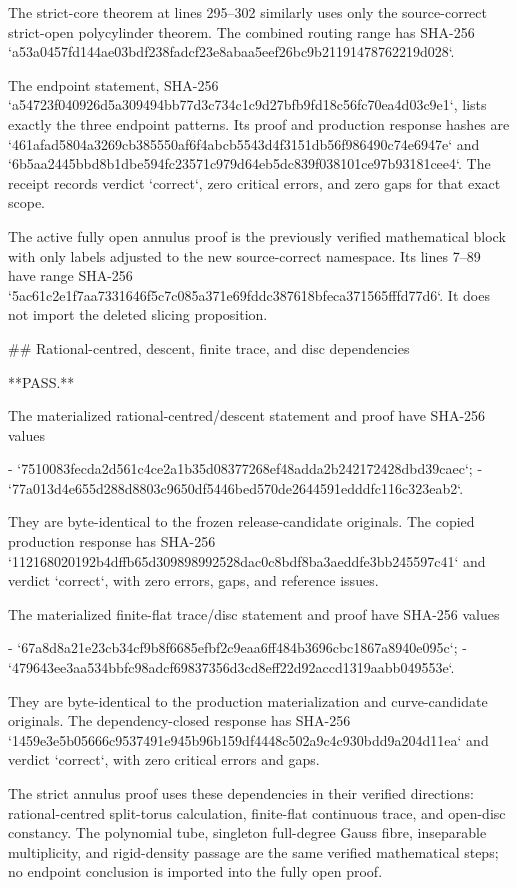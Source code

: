 The strict-core theorem at lines 295--302 similarly uses only the
source-correct strict-open polycylinder theorem.  The combined routing range
has SHA-256
`a53a0457fd144ae03bdf238fadcf23e8abaa5eef26bc9b21191478762219d028`.

The endpoint statement, SHA-256
`a54723f040926d5a309494bb77d3c734c1c9d27bfb9fd18c56fc70ea4d03c9e1`,
lists exactly the three endpoint patterns.  Its proof and production response
hashes are
`461afad5804a3269cb385550af6f4abcb5543d4f3151db56f986490c74e6947e`
and
`6b5aa2445bbd8b1dbe594fc23571c979d64eb5dc839f038101ce97b93181cee4`.
The receipt records verdict `correct`, zero critical errors, and zero gaps for
that exact scope.

The active fully open annulus proof is the previously verified mathematical
block with only labels adjusted to the new source-correct namespace.  Its
lines 7--89 have range SHA-256
`5ac61c2e1f7aa7331646f5c7c085a371e69fddc387618bfeca371565fffd77d6`.
It does not import the deleted slicing proposition.

## Rational-centred, descent, finite trace, and disc dependencies

**PASS.**

The materialized rational-centred/descent statement and proof have SHA-256
values

- `7510083fecda2d561c4ce2a1b35d08377268ef48adda2b242172428dbd39caec`;
- `77a013d4e655d288d8803c9650df5446bed570de2644591edddfc116c323eab2`.

They are byte-identical to the frozen release-candidate originals.  The copied
production response has SHA-256
`112168020192b4dffb65d309898992528dac0c8bdf8ba3aeddfe3bb245597c41`
and verdict `correct`, with zero errors, gaps, and reference issues.

The materialized finite-flat trace/disc statement and proof have SHA-256
values

- `67a8d8a21e23cb34cf9b8f6685efbf2c9eaa6ff484b3696cbc1867a8940e095c`;
- `479643ee3aa534bbfc98adcf69837356d3cd8eff22d92accd1319aabb049553e`.

They are byte-identical to the production materialization and curve-candidate
originals.  The dependency-closed response has SHA-256
`1459e3e5b05666c9537491e945b96b159df4448c502a9c4c930bdd9a204d11ea`
and verdict `correct`, with zero critical errors and gaps.

The strict annulus proof uses these dependencies in their verified directions:
rational-centred split-torus calculation, finite-flat continuous trace, and
open-disc constancy.  The polynomial tube, singleton full-degree Gauss fibre,
inseparable multiplicity, and rigid-density passage are the same verified
mathematical steps; no endpoint conclusion is imported into the fully open
proof.

